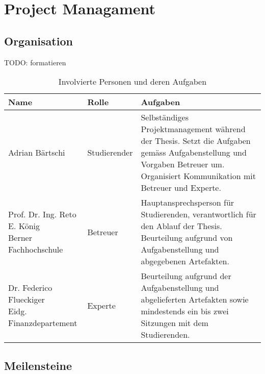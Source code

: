\chapter{Project Managament}
\label{chap:projectmanagement}

\section{Organisation}
TODO: formatieren

\begin{table}[h!]
\begin{tabularx}{\textwidth}{|l|l|X|}

 \hline
 {\bf Name } & {\bf Rolle } & {\bf Aufgaben} \\ 
 \hline
 Adrian Bärtschi                &   Studierender   &     
 Selbständiges Projektmanagement während der Thesis. Setzt die Aufgaben gemäss Aufgabenstellung und Vorgaben Betreuer um. Organisiert Kommunikation mit Betreuer und Experte.   \\
 \hline
  \parbox[t]{5cm}{Prof. Dr. Ing. Reto E. König \\ Berner Fachhochschule}  &   Betreuer  &
  Hauptansprechsperson für Studierenden, verantwortlich für den Ablauf der Thesis. Beurteilung aufgrund von Aufgabenstellung und abgegebenen Artefakten.   \\
 \hline
  \parbox[t]{5cm}{Dr. Federico Flueckiger \\ Eidg.  Finanzdepartement} &   Experte     &
  Beurteilung aufgrund der Aufgabenstellung und abgelieferten Artefakten sowie mindestends ein bis zwei Sitzungen mit dem Studierenden. \\ 
\hline

\end{tabularx}
\caption{Involvierte Personen und deren Aufgaben}
\end{table}



\section{Meilensteine}

